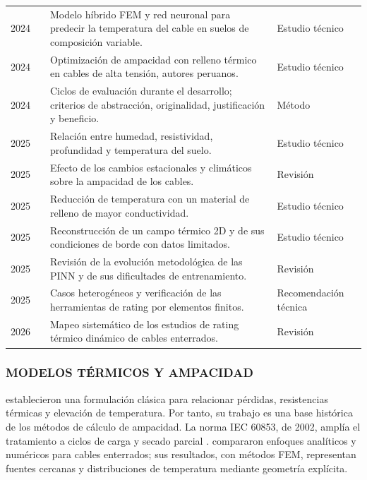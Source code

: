 \begin{longtable}{L{1.1cm}L{3.4cm}L{7.6cm}L{2.4cm}}
2024 & \textcite{aldulaimi2024} & Modelo híbrido FEM y red neuronal para predecir la temperatura del cable en suelos de composición variable. & Estudio técnico \\
2024 & \textcite{atoccsa2024} & Optimización de ampacidad con relleno térmico en cables de alta tensión, autores peruanos. & Estudio técnico \\
2024 & \textcite{delport2024} & Ciclos de evaluación durante el desarrollo; criterios de abstracción, originalidad, justificación y beneficio. & Método \\
2025 & \textcite{khumalo2025} & Relación entre humedad, resistividad, profundidad y temperatura del suelo. & Estudio técnico \\
2025 & \textcite{mobius2025} & Efecto de los cambios estacionales y climáticos sobre la ampacidad de los cables. & Revisión \\
2025 & \textcite{kim2025} & Reducción de temperatura con un material de relleno de mayor conductividad. & Estudio técnico \\
2025 & \textcite{pan2025} & Reconstrucción de un campo térmico 2D y de sus condiciones de borde con datos limitados. & Estudio técnico \\
2025 & \textcite{ren2025} & Revisión de la evolución metodológica de las PINN y de sus dificultades de entrenamiento. & Revisión \\
2025 & \textcite{cigre2025} & Casos heterogéneos y verificación de las herramientas de rating por elementos finitos. & Recomendación técnica \\
2026 & \textcite{fariz2026} & Mapeo sistemático de los estudios de rating térmico dinámico de cables enterrados. & Revisión \\
\bottomrule
\end{longtable}\endgroup

\subsubsection{MODELOS TÉRMICOS Y AMPACIDAD}

\textcite[752--772]{neher1957} establecieron una formulación clásica para relacionar pérdidas, resistencias térmicas y elevación de temperatura. Por tanto, su trabajo es una base histórica de los métodos de cálculo de ampacidad. La norma IEC 60853, de 2002, amplía el tratamiento a ciclos de carga y secado parcial \parencite[cláusulas 2--4]{iec60853}. \textcite[1387--1400]{aras2005} compararon enfoques analíticos y numéricos para cables enterrados; sus resultados, con métodos FEM, representan fuentes cercanas y distribuciones de temperatura mediante geometría explícita.

